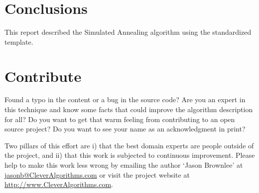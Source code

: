 \documentclass[a4paper, 11pt]{article}
\makeatletter
\newcommand{\myreportauthor}{Jason Brownlee}
\newcommand{\myreportemail}{jasonb@CleverAlgorithms.com}
\newcommand{\myreportwebsite}{http://www.CleverAlgorithms.com}
\makeatother
\begin{document}
% 
% 
\section{Conclusions}
\label{sec:conclusions}
This report described the Simulated Annealing algorithm using the standardized template.

% 
% 
\section{Contribute}
\label{sec:contribute}
Found a typo in the content or a bug in the source code? 
Are you an expert in this technique and know some facts that could improve the algorithm description for all?
Do you want to get that warm feeling from contributing to an open source project? 
Do you want to see your name as an acknowledgment in print?

Two pillars of this effort are i) that the best domain experts are people outside of the project, and ii) that this work is subjected to continuous improvement. 
Please help to make this work less wrong by emailing the author `\myreportauthor' at \url{\myreportemail} or visit the project website at \url{\myreportwebsite}.



\end{document}
